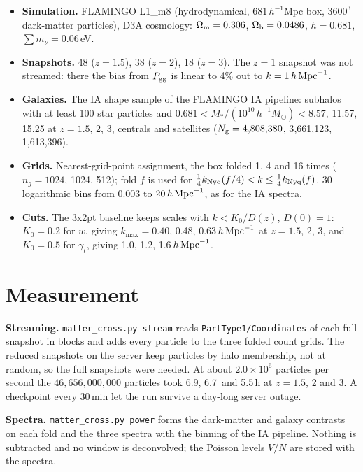 \documentclass[11pt]{article}
\newcommand{\hMpc}{\,h\,{\rm Mpc}^{-1}}
\newcommand{\Pgg}{P_{\rm gg}}
\newcommand{\kwA}{0.40}
\newcommand{\kwB}{0.48}
\newcommand{\kwC}{0.63}
\newcommand{\kgA}{1.0}
\newcommand{\kgB}{1.2}
\newcommand{\kgC}{1.6}
\newcommand{\NdmTot}{46{,}656{,}000{,}000}
\newcommand{\NgA}{4{,}808{,}380}
\newcommand{\NgB}{3{,}661{,}123}
\newcommand{\NgC}{1{,}613{,}396}
\newcommand{\TA}{6.9}        %
\newcommand{\TB}{6.7}
\newcommand{\TC}{5.5}
\newcommand{\Rate}{2.0}      %
\begin{document}
\begin{itemize}
\item \textbf{Simulation.} FLAMINGO L1\_m8 (hydrodynamical, $681\,h^{-1}$Mpc box,
  $3600^3$ dark-matter particles), D3A cosmology: $\Omega_{\rm m} = 0.306$,
  $\Omega_{\rm b} = 0.0486$, $h = 0.681$, $\sum m_\nu = 0.06$\,eV.
\item \textbf{Snapshots.} 48 ($z = 1.5$), 38 ($z = 2$), 18 ($z = 3$). The
  $z = 1$ snapshot was not streamed: there the bias from $\Pgg$ is linear to
  4\% out to $k = 1\hMpc$.
\item \textbf{Galaxies.} The IA shape sample of the FLAMINGO IA pipeline:
  subhalos with at least 100 star particles and
  $0.681 < M_*/(10^{10}\,h^{-1}M_\odot) < 8.57$, 11.57, 15.25 at
  $z = 1.5$, 2, 3, centrals and satellites ($N_{\rm g} = \NgA$, \NgB,
  \NgC).
\item \textbf{Grids.} Nearest-grid-point assignment, the box folded 1, 4 and 16
  times ($n_g = 1024$, 1024, 512); fold $f$ is used for
  $\tfrac14 k_{\rm Nyq}(f/4) < k \le \tfrac14 k_{\rm Nyq}(f)$. 30 logarithmic
  bins from 0.003 to $20\hMpc$, as for the IA spectra.
\item \textbf{Cuts.} The 3x2pt baseline keeps scales with
  $k < K_0/D(z)$, $D(0) = 1$: $K_0 = 0.2$ for $w$, giving
  $k_{\max} = \kwA$, \kwB, \kwC$\hMpc$ at $z = 1.5$, 2, 3, and $K_0 = 0.5$ for
  $\gamma_t$, giving \kgA, \kgB, \kgC$\hMpc$.
\end{itemize}

\section{Measurement}

\textbf{Streaming.} \texttt{matter\_cross.py stream} reads
\texttt{PartType1/Coordinates} of each full snapshot in blocks and adds every
particle to the three folded count grids. The reduced snapshots on the server
keep particles by halo membership, not at random, so the full snapshots were
needed. At about $\Rate\times10^6$ particles per second the
$\NdmTot$ particles took \TA, \TB\ and \TC\,h at $z = 1.5$, 2 and 3. A
checkpoint every 30\,min let the run survive a day-long server outage.

\textbf{Spectra.} \texttt{matter\_cross.py power} forms the dark-matter and
galaxy contrasts on each fold and the three spectra with the binning of the IA
pipeline. Nothing is subtracted and no window is deconvolved; the Poisson
levels $V/N$ are stored with the spectra.
\end{document}
